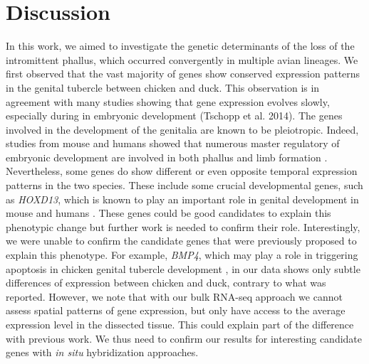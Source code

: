 \section{Discussion}
In this work, we aimed to investigate the genetic determinants of the loss of the intromittent phallus, which occurred convergently in multiple avian lineages. We first observed that the vast majority of genes show conserved expression patterns in the genital tubercle between chicken and duck. This observation is in agreement with many studies showing that gene expression evolves slowly, especially during in embryonic development \citep{brawand_evolution_2011, cardoso-moreira_gene_2019}(Tschopp et al. 2014).  The genes involved in the development of the genitalia are known to be pleiotropic. Indeed, studies from mouse and humans showed that numerous master regulatory of embryonic development are involved in both phallus and limb formation \citep{lonfat_convergent_2014,infante_shared_2015}. \\

Nevertheless, some genes do show different or even opposite temporal expression patterns in the two species. These include some crucial developmental genes, such as \textit{HOXD13}, which is known to play an important role in genital development in mouse and humans \citep{dolle_hox-4_1991, klonisch_molecular_2004}. These genes could be good candidates to explain this phenotypic change but further work is needed to confirm their role. Interestingly, we were unable to confirm the candidate genes that were previously proposed to explain this phenotype. For example, \textit{BMP4}, which may play a role in triggering apoptosis in chicken genital tubercle development \citep{herrera_developmental_2013}, in our data shows only subtle differences of expression between chicken and duck, contrary to what was reported. However, we note that with our bulk RNA-seq approach we cannot assess spatial patterns of gene expression, but only have access to the average expression level in the dissected tissue. This could explain part of the difference with previous work. We thus need to confirm our results for interesting candidate genes with \textit{in situ} hybridization approaches.\\



